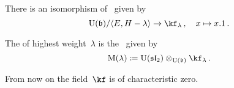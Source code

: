 \documentclass[a4paper, 11pt, oneside]{scrartcl}
\begin{document}
\begin{lemma}
  There is an isomorphism of~\modules{$\Univ(\blie)$} given by
  \[
    \Univ(\blie) / \gen{E, H - \lambda}
    \to
    \kf_\lambda \,,
    \quad
    x
    \mapsto
    x.1 \,.
  \]
\end{lemma}

\begin{definition}
  The  of highest weight~$\lambda$ is the~ given by
  \[
    \verma(\lambda)
    \defined
    \Univ(\sllie_2) \tensor_{\Univ(\blie)} \kf_\lambda \,.
  \]
\end{definition}

\begin{convention}
  From now on the field~$\kf$ is of characteristic zero.
\end{convention}
\end{document}

